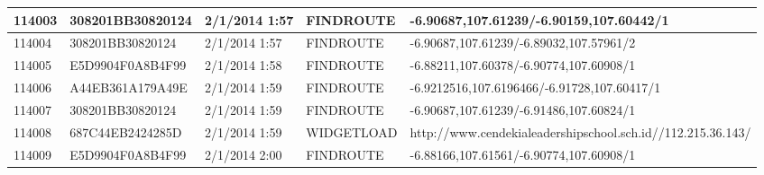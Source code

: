 \begin{longtable}{|p{1cm}|l|l|l|p{8cm}|}
114003         & 308201BB30820124 & 2/1/2014 1:57            & FINDROUTE       & -6.90687,107.61239/-6.90159,107.60442/1                                                                                                                                                                               \\ \hline
114004         & 308201BB30820124 & 2/1/2014 1:57            & FINDROUTE       & -6.90687,107.61239/-6.89032,107.57961/2                                                                                                                                                                               \\ \hline
114005         & E5D9904F0A8B4F99 & 2/1/2014 1:58            & FINDROUTE       & -6.88211,107.60378/-6.90774,107.60908/1                                                                                                                                                                               \\ \hline
114006         & A44EB361A179A49E & 2/1/2014 1:59            & FINDROUTE       & -6.9212516,107.6196466/-6.91728,107.60417/1                                                                                                                                                                           \\ \hline
114007         & 308201BB30820124 & 2/1/2014 1:59            & FINDROUTE       & -6.90687,107.61239/-6.91486,107.60824/1                                                                                                                                                                               \\ \hline
114008         & 687C44EB2424285D & 2/1/2014 1:59            & WIDGETLOAD      & http://www.cendekialeadershipschool.sch.id//112.215.36.143/                                                                                                                                                           \\ \hline
114009         & E5D9904F0A8B4F99 & 2/1/2014 2:00            & FINDROUTE       & -6.88166,107.61561/-6.90774,107.60908/1                                                                                                                                                                               \\ \hline
\end{longtable}